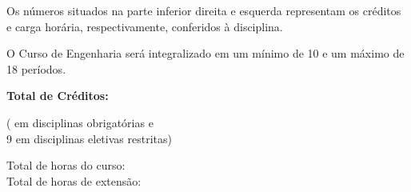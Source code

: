 \documentclass[a4paper, landscape]{article}
\newcounter{cred}
\newcounter{thoras}
\begin{document}
\vspace{-4mm}
\setlength\parindent{0pt}

\begin{multicols}{4}
  \vfill
  Os números situados na parte inferior direita e esquerda representam os créditos e carga horária, respectivamente, conferidos à disciplina.

  
  \columnbreak
  O Curso de Engenharia será integralizado em um mínimo de 10 e um máximo de 18 períodos.

  \columnbreak
  \textbf{Total de Créditos:} \the\value{cred}\\
  \addtocounter{cred}{-9}
  (\the\value{cred} em disciplinas obrigatórias e\\ 9 em disciplinas eletivas restritas)

  \columnbreak
  Total de horas do curso: \the\value{thoras}\\
  Total de horas de extensão: \the\value{hextensao}

  
\end{multicols}
\end{document}
